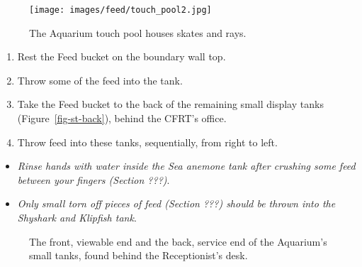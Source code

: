 \documentclass[
  12pt,
]{report}
\providecommand{\tightlist}{%
  \setlength{\itemsep}{0pt}\setlength{\parskip}{0pt}}\usepackage{longtable,booktabs,array}
\begin{document}
\begin{figure}[H]

{\centering \texttt{[image: images/feed/touch\_pool2.jpg]}

}

\caption{\label{fig-touch-pool}The Aquarium touch pool houses skates and
rays.}

\end{figure}

\begin{enumerate}
\def\labelenumi{\arabic{enumi}.}
\setcounter{enumi}{16}
\tightlist
\item
  Rest the Feed bucket on the boundary wall top.
\item
  Throw some of the feed into the tank.
\item
  Take the Feed bucket to the back of the remaining small display tanks
  (Figure~\ref{fig-st-back}), behind the CFRT's office.
\item
  Throw feed into these tanks, sequentially, from right to left.
\end{enumerate}

\begin{itemize}
\tightlist
\item
  \emph{Rinse hands with water inside the Sea anemone tank after
  crushing some feed between your fingers (Section ???)}.
\item
  \emph{Only small torn off pieces of feed (Section ???) should be
  thrown into the Shyshark and Klipfish tank}.
\end{itemize}

\begin{figure}[H]

\begin{minipage}[t]{0.50\linewidth}

{\centering 


}

\end{minipage}%
%
\begin{minipage}[t]{0.50\linewidth}

{\centering 


}

\end{minipage}%

\caption{\label{fig-small-tanks}The front, viewable end and the back,
service end of the Aquarium's small tanks, found behind the
Receptionist's desk.}

\end{figure}
\end{document}
